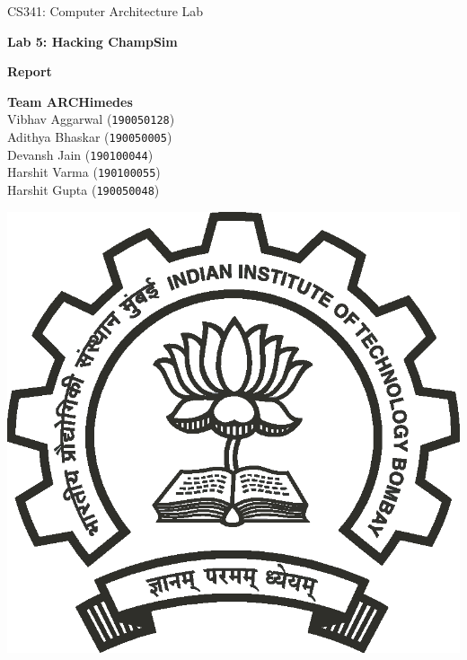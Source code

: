\documentclass[11pt, swedish, openany]{book}
\begin{document}

\begin{titlepage}
  \clearpage\thispagestyle{empty}
  \centering
  \vspace{2cm}

  {\large CS341: Computer Architecture Lab\par}
  \vspace{4cm}
  {\Huge \textbf{Lab 5: Hacking ChampSim}} \\
  \vspace{0.2cm}
  {\huge \textbf{Report} \par}
  \vspace{4cm}
  {\normalsize {\large \textbf{Team ARCHimedes}}\\
    Vibhav Aggarwal (\texttt{190050128}) \\
    Adithya Bhaskar (\texttt{190050005}) \\
    Devansh Jain (\texttt{190100044}) \\
    Harshit Varma (\texttt{190100055}) \\
    Harshit Gupta (\texttt{190050048})
    \par}
  \vspace{2cm}
  \vfill

  \includegraphics[scale=0.30]{iitb_logo/iitb_logo.eps}


\end{titlepage}
\end{document}
